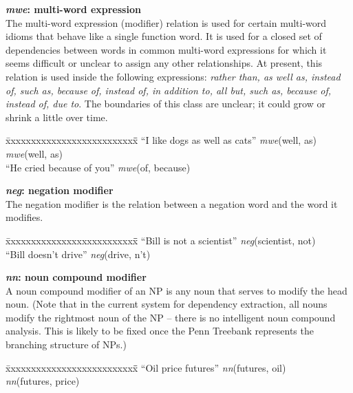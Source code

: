 \documentclass[11pt,letterpaper]{article}
\begin{document}
\noindent\textbf{\emph{mwe}: multi-word expression}\\
The multi-word expression (modifier) relation is used for certain multi-word idioms
that behave like a single function word.  It is used for a closed set
of dependencies between words in common multi-word expressions for which
it seems difficult or unclear to assign any other relationships.  At
present, this relation is used inside the following expressions:
\emph{rather than, as well as, instead of, such as, because of, instead
  of, in addition to, all but, such as, because of, instead of, due to}.  The boundaries of this class are unclear; it could
grow or shrink a little over time.
\begin{tabbing}
\hspace{1cm} \= xxxxxxxxxxxxxxxxxxxxxxxxxx\= \hspace{.5cm}\=  \kill
\>  ``I like dogs as well as cats'' \> \> \emph{mwe}(well, as)\\
\>                                 \> \> \emph{mwe}(well, as)\\
\> ``He cried because of you'' \> \> \emph{mwe}(of, because)\\
\end{tabbing}

\noindent\textbf{\emph{neg}: negation modifier}\\
The negation modifier is the relation between a negation word and the word it modifies.
\begin{tabbing}
\hspace{1cm} \= xxxxxxxxxxxxxxxxxxxxxxxxxx\= \hspace{.5cm}\=  \kill
\>  ``Bill is not a scientist'' \> \> \emph{neg}(scientist, not)\\
\> ``Bill doesn't drive'' \> \> \emph{neg}(drive, n't)\\
\end{tabbing}

\noindent\textbf{\emph{nn}: noun compound modifier}\\
A noun compound modifier of an NP is any noun that serves to modify the head noun. (Note that in the current system for dependency extraction, all nouns modify the rightmost noun of the NP -- there is no intelligent noun compound analysis.  This is likely to be fixed once the Penn Treebank represents the branching structure of NPs.)
\begin{tabbing}
\hspace{1cm} \= xxxxxxxxxxxxxxxxxxxxxxxxxx\= \hspace{.5cm}\=  \kill
\>  ``Oil price futures'' \> \> \emph{nn}(futures, oil)\\
\> \> \> \emph{nn}(futures, price)\\
\end{tabbing}
\end{document}
